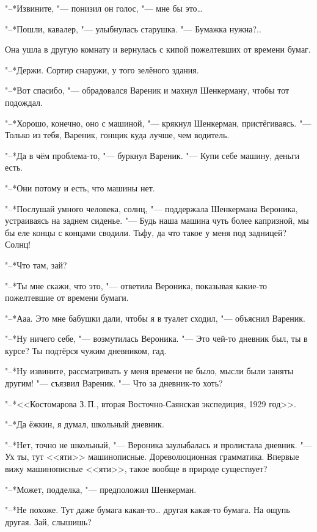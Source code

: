 "--*Извините, "--- понизил он голос, "--- мне бы это\ldots{}

"--*Пошли, кавалер, "--- улыбнулась старушка.
"--- Бумажка нужна?..

Она ушла в другую комнату и вернулась с кипой пожелтевших от времени бумаг.

"--*Держи.
Сортир снаружи, у того зелёного здания.

"--*Вот спасибо, "--- обрадовался Вареник и махнул Шенкерману, чтобы тот подождал.

\textspace

\asterism

\textspace

"--*Хорошо, конечно, оно с машиной, "--- крякнул Шенкерман, пристёгиваясь.
"--- Только из тебя, Вареник, гонщик куда лучше, чем водитель.

"--*Да в чём проблема-то, "--- буркнул Вареник.
"--- Купи себе машину, деньги есть.

"--*Они потому и есть, что машины нет.

"--*Послушай умного человека, солнц, "--- поддержала Шенкермана Вероника, устраиваясь на заднем сиденье.
"--- Будь наша машина чуть более капризной, мы бы еле концы с концами сводили.
Тьфу, да что такое у меня под задницей?
Солнц!

"--*Что там, зай?

"--*Ты мне скажи, что это, "--- ответила Вероника, показывая какие-то пожелтевшие от времени бумаги.

"--*Ааа.
Это мне бабушки дали, чтобы я в туалет сходил, "--- объяснил Вареник.

"--*Ну ничего себе, "--- возмутилась Вероника.
"--- Это чей-то дневник был, ты в курсе?
Ты подтёрся чужим дневником, гад.

"--*Ну извините, рассматривать у меня времени не было, мысли были заняты другим! "--- съязвил Вареник.
"--- Что за дневник-то хоть?

"--*<<Костомарова З.\,П., вторая Восточно-Саянская экспедиция, 1929 год>>.

"--*Да ёжкин, я думал, школьный дневник.

"--*Нет, точно не школьный, "--- Вероника заулыбалась и пролистала дневник.
"--- Ух ты, тут <<яти>> машинописные.
Дореволюционная грамматика.
Впервые вижу машинописные <<яти>>, такое вообще в природе существует?

"--*Может, подделка, "--- предположил Шенкерман.

"--*Не похоже.
Тут даже бумага какая-то\ldots{} другая какая-то бумага.
На ощупь другая.
Зай, слышишь?

